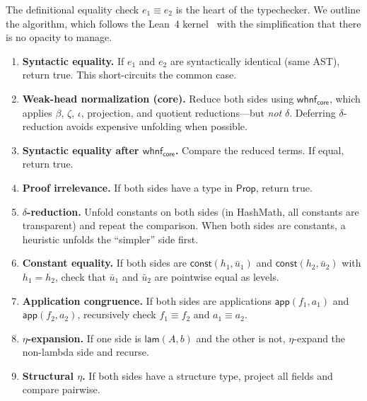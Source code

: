 \documentclass[11pt]{article}
\theoremstyle{definition}
\theoremstyle{plain}
\theoremstyle{remark}
\newcommand{\Prop}{\textsf{Prop}}
\newcommand{\const}{\textsf{const}}
\newcommand{\app}{\textsf{app}}
\newcommand{\lam}{\textsf{lam}}
\newcommand{\whnf}{\textsf{whnf}}
\begin{document}
The definitional equality check $e_1 \equiv e_2$ is the heart of the typechecker.
We outline the algorithm, which follows the Lean~4 kernel~\cite{lean4} with the
simplification that there is no opacity to manage.

\begin{enumerate}[nosep]
  \item \textbf{Syntactic equality.}
        If $e_1$ and $e_2$ are syntactically identical (same AST), return true.
        This short-circuits the common case.

  \item \textbf{Weak-head normalization (core).}
        Reduce both sides using $\whnf_{\textsf{core}}$, which applies $\beta$, $\zeta$, $\iota$, projection, and quotient reductions---but \emph{not} $\delta$.
        Deferring $\delta$-reduction avoids expensive unfolding when possible.

  \item \textbf{Syntactic equality after $\whnf_{\textsf{core}}$.}
        Compare the reduced terms. If equal, return true.

  \item \textbf{Proof irrelevance.}
        If both sides have a type in $\Prop$, return true.

  \item \textbf{$\delta$-reduction.}
        Unfold constants on both sides (in HashMath, all constants are transparent) and repeat the comparison.
        When both sides are constants, a heuristic unfolds the ``simpler'' side first.

  \item \textbf{Constant equality.}
        If both sides are $\const(h_1, \bar{u}_1)$ and $\const(h_2, \bar{u}_2)$ with $h_1 = h_2$, check that $\bar{u}_1$ and $\bar{u}_2$ are pointwise equal as levels.

  \item \textbf{Application congruence.}
        If both sides are applications $\app(f_1, a_1)$ and $\app(f_2, a_2)$,
        recursively check $f_1 \equiv f_2$ and $a_1 \equiv a_2$.

  \item \textbf{$\eta$-expansion.}
        If one side is $\lam(A, b)$ and the other is not, $\eta$-expand the non-lambda side and recurse.

  \item \textbf{Structural $\eta$.}
        If both sides have a structure type, project all fields and compare pairwise.
\end{enumerate}
\end{document}
